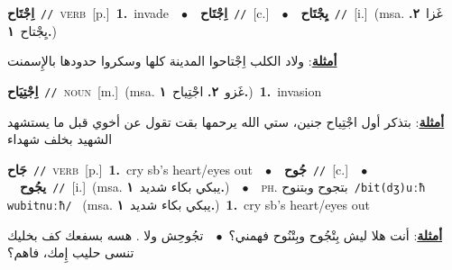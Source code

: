 \documentclass[10pt,a4paper,twoside]{article} %
\begin{document}
\begin{multicols}{2}
{\setlength\topsep{0pt}\textbf{\foreignlanguage{arabic}{اِجْتَاح}}\ {\color{gray}\texttt{//}\color{black}}\ \textsc{verb}\ [p.]\ \textbf{1.}~invade\ \ $\bullet$\ \ \setlength\topsep{0pt}\textbf{\foreignlanguage{arabic}{اِجْتَاح}}\ {\color{gray}\texttt{//}\color{black}}\ [c.]\ \ $\bullet$\ \ \setlength\topsep{0pt}\textbf{\foreignlanguage{arabic}{يِجْتَاح}}\ {\color{gray}\texttt{//}\color{black}}\ [i.]\ \color{gray}(msa. \foreignlanguage{arabic}{غَزا}~\foreignlanguage{arabic}{\textbf{٢.}}  \foreignlanguage{arabic}{يِجْتاح}~\foreignlanguage{arabic}{\textbf{١.}})\color{black}\  \begin{flushright}\color{gray}\foreignlanguage{arabic}{\textbf{\underline{\foreignlanguage{arabic}{أمثلة}}}: ولاد الكلب اِجْتاحوا المدينة كلها وسكروا حدودها بالإِسمنت}\end{flushright}\color{black}} \vspace{2mm}

{\setlength\topsep{0pt}\textbf{\foreignlanguage{arabic}{اِجْتِيَاح}}\ {\color{gray}\texttt{//}\color{black}}\ \textsc{noun}\ [m.]\ \color{gray}(msa. \foreignlanguage{arabic}{غَزو}~\foreignlanguage{arabic}{\textbf{٢.}}  \foreignlanguage{arabic}{اجْتِياح}~\foreignlanguage{arabic}{\textbf{١.}})\color{black}\ \textbf{1.}~invasion\  \begin{flushright}\color{gray}\foreignlanguage{arabic}{\textbf{\underline{\foreignlanguage{arabic}{أمثلة}}}: بتذكر أول اجْتِياح جنين، ستي الله يرحمها بقت تقول عن أخوي قبل ما يستشهد الشهيد بخلف شهداء}\end{flushright}\color{black}} \vspace{2mm}

{\setlength\topsep{0pt}\textbf{\foreignlanguage{arabic}{جَاح}}\ {\color{gray}\texttt{//}\color{black}}\ \textsc{verb}\ [p.]\ \textbf{1.}~cry sb's heart/eyes out\ \ $\bullet$\ \ \setlength\topsep{0pt}\textbf{\foreignlanguage{arabic}{جُوح}}\ {\color{gray}\texttt{//}\color{black}}\ [c.]\ \ $\bullet$\ \ \setlength\topsep{0pt}\textbf{\foreignlanguage{arabic}{يجُوح}}\ {\color{gray}\texttt{//}\color{black}}\ [i.]\ \color{gray}(msa. \foreignlanguage{arabic}{يبكي بكاء شديد}~\foreignlanguage{arabic}{\textbf{١.}})\color{black}\ \ $\bullet$\ \ \textsc{ph.} \color{gray} \foreignlanguage{arabic}{بتجوح وبتنوح}\color{black}\ {\color{gray}\texttt{/{\sffamily bit(dʒ)uːħ wubitnuːħ}/}\color{black}}\ \color{gray} (msa. \foreignlanguage{arabic}{يبكي بكاء شديد}~\foreignlanguage{arabic}{\textbf{١.}})\color{black}\ \textbf{1.}~cry sb's heart/eyes out\  \begin{flushright}\color{gray}\foreignlanguage{arabic}{\textbf{\underline{\foreignlanguage{arabic}{أمثلة}}}: أنت هلا ليش بِتْجُوح وبِتْنُوح فهمني؟\ $\bullet$\ \  تجُوحِش ولا . هسه بسفعك كف بخليك تنسى حليب إِمك، فاهم؟}\end{flushright}\color{black}} \vspace{2mm}


\end{multicols}
\end{document}
